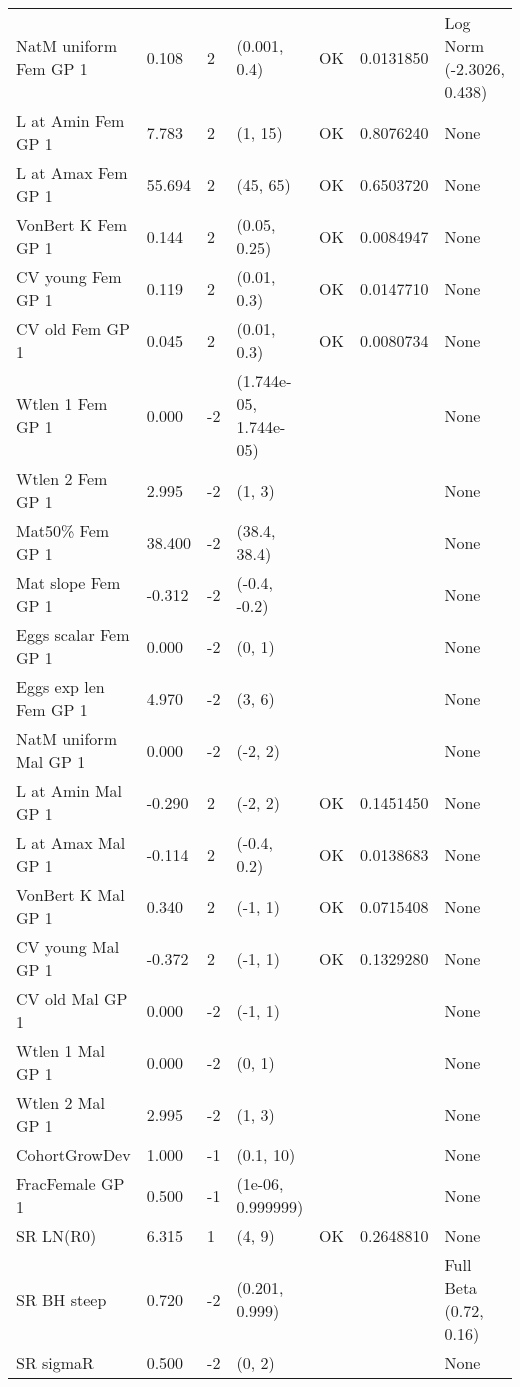 \documentclass[11pt,
  english,
  a4paper,
]{article}
\begin{document}
\begin{landscape}
\begin{longtable}[t]{>{\raggedright\arraybackslash}p{8.5cm}lllll>{\raggedright\arraybackslash}p{4cm}}
\endfoot
\bottomrule
\endlastfoot
NatM uniform Fem GP 1 & 0.108 & 2 & (0.001, 0.4) & OK & 0.0131850 & Log Norm (-2.3026, 0.438)\\
L at Amin Fem GP 1 & 7.783 & 2 & (1, 15) & OK & 0.8076240 & None\\
L at Amax Fem GP 1 & 55.694 & 2 & (45, 65) & OK & 0.6503720 & None\\
VonBert K Fem GP 1 & 0.144 & 2 & (0.05, 0.25) & OK & 0.0084947 & None\\
CV young Fem GP 1 & 0.119 & 2 & (0.01, 0.3) & OK & 0.0147710 & None\\
CV old Fem GP 1 & 0.045 & 2 & (0.01, 0.3) & OK & 0.0080734 & None\\
Wtlen 1 Fem GP 1 & 0.000 & -2 & (1.744e-05, 1.744e-05) &  &  & None\\
Wtlen 2 Fem GP 1 & 2.995 & -2 & (1, 3) &  &  & None\\
Mat50\% Fem GP 1 & 38.400 & -2 & (38.4, 38.4) &  &  & None\\
Mat slope Fem GP 1 & -0.312 & -2 & (-0.4, -0.2) &  &  & None\\
Eggs scalar Fem GP 1 & 0.000 & -2 & (0, 1) &  &  & None\\
Eggs exp len Fem GP 1 & 4.970 & -2 & (3, 6) &  &  & None\\
NatM uniform Mal GP 1 & 0.000 & -2 & (-2, 2) &  &  & None\\
L at Amin Mal GP 1 & -0.290 & 2 & (-2, 2) & OK & 0.1451450 & None\\
L at Amax Mal GP 1 & -0.114 & 2 & (-0.4, 0.2) & OK & 0.0138683 & None\\
VonBert K Mal GP 1 & 0.340 & 2 & (-1, 1) & OK & 0.0715408 & None\\
CV young Mal GP 1 & -0.372 & 2 & (-1, 1) & OK & 0.1329280 & None\\
CV old Mal GP 1 & 0.000 & -2 & (-1, 1) &  &  & None\\
Wtlen 1 Mal GP 1 & 0.000 & -2 & (0, 1) &  &  & None\\
Wtlen 2 Mal GP 1 & 2.995 & -2 & (1, 3) &  &  & None\\
CohortGrowDev & 1.000 & -1 & (0.1, 10) &  &  & None\\
FracFemale GP 1 & 0.500 & -1 & (1e-06, 0.999999) &  &  & None\\
SR LN(R0) & 6.315 & 1 & (4, 9) & OK & 0.2648810 & None\\
SR BH steep & 0.720 & -2 & (0.201, 0.999) &  &  & Full Beta (0.72, 0.16)\\
SR sigmaR & 0.500 & -2 & (0, 2) &  &  & None\\

\end{longtable}
\end{landscape}
\end{document}
